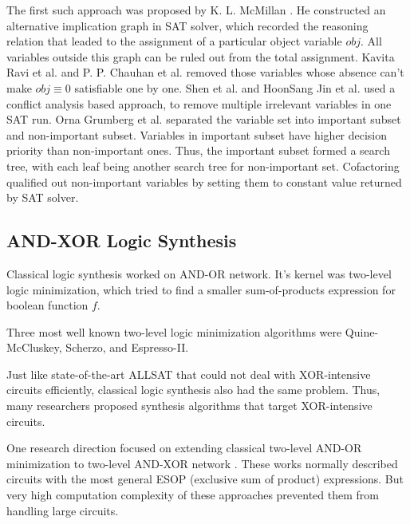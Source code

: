 \documentclass[journal]{IEEEtran}
\begin{document}
The first such approach was proposed by K. L. McMillan \cite{SATUNBMC}.
He constructed an alternative implication graph in SAT solver,
which recorded the reasoning relation that leaded to the assignment of a particular object variable $obj$.
All variables outside this graph can be ruled out from the total assignment.
Kavita Ravi et al.\cite{MINASS} and P. P. Chauhan et al.\cite{REPARAM} removed those variables whose absence can't make $obj\equiv 0$ satisfiable one by one.
Shen et al.\cite{MINCEX} and HoonSang Jin et al.\cite{PRIMECLAUSE,EFFCON} used a conflict analysis based approach,
to remove multiple irrelevant variables in one SAT run.
Orna Grumberg et al.\cite{MEMEFFALLSAT} separated the variable set into important subset and non-important subset.
Variables in important subset have higher decision priority than non-important ones.
Thus,
the important subset formed a search tree,
with each leaf being another search tree for non-important set.
Cofactoring \cite{EFFSATUSMCCO} qualified out non-important variables by setting them to constant value returned by SAT solver.

\subsection{AND-XOR Logic Synthesis}

Classical logic synthesis worked on AND-OR network.
It's kernel was two-level logic minimization,
which tried to find a smaller sum-of-products expression for boolean function $f$.

Three most well known two-level logic minimization algorithms were Quine-McCluskey\cite{McCluskey},
Scherzo\cite{Scherzo},
and Espresso-II\cite{Espresso}.

Just like state-of-the-art ALLSAT that could not deal with XOR-intensive circuits efficiently,
classical logic synthesis also had the same problem.
Thus,
many researchers proposed synthesis algorithms that target XOR-intensive circuits.

One research direction focused on extending classical two-level AND-OR minimization to two-level AND-XOR network \cite{Mod2sum,ANDEXOR}.
These works normally described circuits with the most general ESOP (exclusive sum of product) expressions.
But very high computation complexity of these approaches prevented them from handling large circuits.
\end{document}

